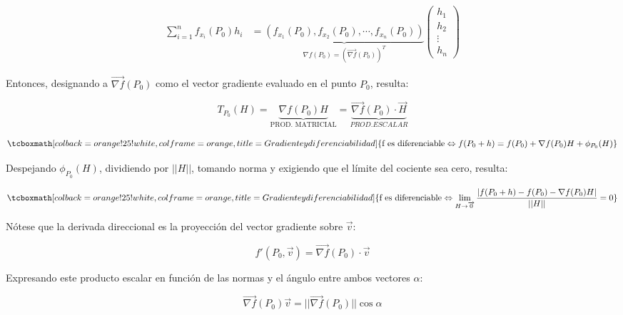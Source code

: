 \documentclass{article}
\begin{document}
\begin{align}
    \sum\limits_{i=1}^{n}{ f_{x_i}(P_0) h_i } &= \underbrace{ (f_{x_1}(P_0), f_{x_2}(P_0), \cdots, f_{x_n}(P_0)) }_{ \nabla{f(P_0)} = (\overrightarrow{\nabla{f}}(P_0))^T }
    \begin{pmatrix}
           h_1 \\
           h_2 \\
           \vdots \\
           h_n
    \end{pmatrix}
\end{align}

Entonces, designando a $\overrightarrow{\nabla{f}}(P_0)$ como el vector gradiente evaluado en el punto $P_0$, resulta:

\begin{equation}
T_{P_0}(H) = \underbrace{ \nabla{f}(P_0) H }_{\text{PROD. MATRICIAL}} = \underbrace{ \overrightarrow{\nabla{f}}(P_0) \cdot \overrightarrow{H} }_{PROD. ESCALAR}
\end{equation}

\begin{equation}
\tcboxmath[colback=orange!25!white,colframe=orange, title=Gradiente y diferenciabilidad]
{ \text{f es diferenciable} \Leftrightarrow f(P_0 + h) = f(P_0) + \nabla{f}(P_0) H + \phi_{P_0}(H) }
\end{equation}

Despejando $\phi_{P_0}(H)$, dividiendo por $||H||$, tomando norma y exigiendo que el límite del cociente sea cero, resulta:

\begin{equation}
\tcboxmath[colback=orange!25!white,colframe=orange, title=Gradiente y diferenciabilidad]
{ \text{f es diferenciable} \Leftrightarrow \lim_{H \rightarrow \overrightarrow{0}}\frac{ |f(P_0 + h) - f(P_0) - \nabla{f}(P_0) H| }{||H||} = 0 }
\end{equation}

Nótese que la derivada direccional es la proyección del vector gradiente sobre $\overrightarrow{v}$:

\begin{equation}
f'(P_0, \overrightarrow{v}) = \overrightarrow{ \nabla{f} }(P_0) \cdot \overrightarrow{v}
\end{equation}

Expresando este producto escalar en función de las normas y el ángulo entre ambos vectores $\alpha$:

\begin{equation}
\overrightarrow{ \nabla{f} }(P_0) \overrightarrow{v} = ||\overrightarrow{ \nabla{f} }(P_0)|| \cos \alpha
\end{equation}
\end{document}
